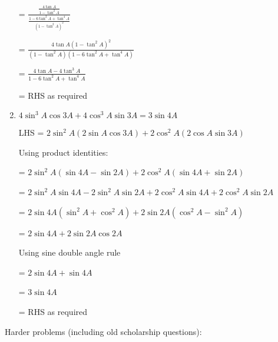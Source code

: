 \documentclass[../main.tex]{subfiles}
\begin{document}
\begin{enumerate}
    = $\frac{\frac{4\tan{A}}{1-\tan^2{A}}}{\frac{1-6\tan^2{A}+\tan^4{A}}{(1-\tan^2{A})^2}}$

    = $\frac{4\tan{A}(1-\tan^2{A})^2}{(1-\tan^2{A})(1-6\tan^2{A}+\tan^4{A})}$

    = $\frac{4\tan{A}-4\tan^3{A}}{1-6\tan^2{A}+\tan^4{A}}$

    = RHS as required

    \item $4\sin^3{A}\cos{3A}+4\cos^3{A}\sin{3A}=3\sin{4A}$

    LHS = $2\sin^2{A}(2\sin{A}\cos{3A})+2\cos^2{A}(2\cos{A}\sin{3A})$

    Using product identities:

    = $2\sin^2{A}(\sin{4A}-\sin{2A})+2\cos^2{A}(\sin{4A}+\sin{2A})$

    = $2\sin^2{A}\sin{4A}-2\sin^2{A}\sin{2A}+2\cos^2{A}\sin{4A}+2\cos^2{A}\sin{2A}$

    = $2\sin{4A}(\sin^2{A}+\cos^2{A})+2\sin{2A}(\cos^2{A}-\sin^2{A})$

    = $2\sin{4A}+2\sin{2A}\cos{2A}$

    Using sine double angle rule

    = $2\sin{4A}+\sin{4A}$

    = $3\sin{4A}$

    = RHS as required


\end{enumerate}
Harder problems (including old scholarship questions):
\end{document}
